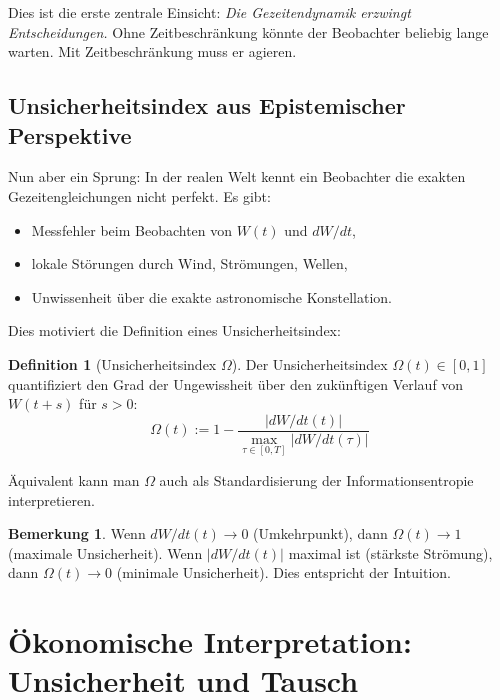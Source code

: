 \documentclass[a4paper, 12pt, twoside, openright]{report}
\theoremstyle{definition}
\newtheorem{definition}[theorem]{Definition}
\theoremstyle{definition}
\newtheorem{bemerkung}{Bemerkung}[chapter]
\begin{document}
Dies ist die erste zentrale Einsicht: \emph{Die Gezeitendynamik erzwingt Entscheidungen.} Ohne Zeitbeschränkung könnte der Beobachter beliebig lange warten. Mit Zeitbeschränkung muss er agieren.

\subsection{Unsicherheitsindex aus Epistemischer Perspektive}

Nun aber ein Sprung: In der realen Welt kennt ein Beobachter die exakten Gezeitengleichungen nicht perfekt. Es gibt:
\begin{itemize}
    \item Messfehler beim Beobachten von $W(t)$ und $dW/dt$,
    \item lokale Störungen durch Wind, Strömungen, Wellen,
    \item Unwissenheit über die exakte astronomische Konstellation.
\end{itemize}

Dies motiviert die Definition eines Unsicherheitsindex:

\begin{definition}[Unsicherheitsindex $\Omega$]
    Der Unsicherheitsindex $\Omega(t) \in [0,1]$ quantifiziert den Grad der Ungewissheit über den zukünftigen Verlauf von $W(t+s)$ für $s > 0$:
    \begin{equation}
        \Omega(t) := 1 - \frac{|dW/dt(t)|}{\max_{\tau \in [0,T]} |dW/dt(\tau)|}
    \end{equation}
    
    Äquivalent kann man $\Omega$ auch als Standardisierung der Informationsentropie interpretieren.
\end{definition}

\begin{bemerkung}
    Wenn $dW/dt(t) \to 0$ (Umkehrpunkt), dann $\Omega(t) \to 1$ (maximale Unsicherheit). Wenn $|dW/dt(t)|$ maximal ist (stärkste Strömung), dann $\Omega(t) \to 0$ (minimale Unsicherheit). Dies entspricht der Intuition.
\end{bemerkung}

\section{Ökonomische Interpretation: Unsicherheit und Tausch}
\end{document}
